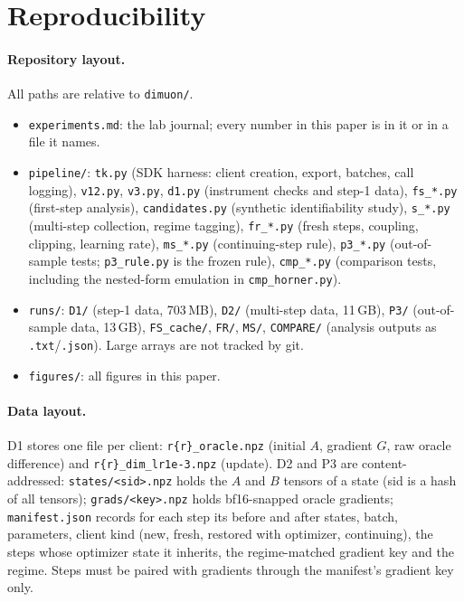 \documentclass[11pt]{article}
\begin{document}
\appendix
\section{Reproducibility}\label{app:repro}

\paragraph{Repository layout.} All paths are relative to \texttt{dimuon/}.
\begin{itemize}
\item \texttt{experiments.md}: the lab journal; every number in this paper is in it or in a file it
names.
\item \texttt{pipeline/}: \texttt{tk.py} (SDK harness: client creation, export, batches, call
logging), \texttt{v12.py}, \texttt{v3.py}, \texttt{d1.py} (instrument checks and step-1 data),
\texttt{fs\_*.py} (first-step analysis), \texttt{candidates.py} (synthetic identifiability study),
\texttt{s\_*.py} (multi-step collection, regime tagging), \texttt{fr\_*.py} (fresh steps, coupling,
clipping, learning rate), \texttt{ms\_*.py} (continuing-step rule), \texttt{p3\_*.py}
(out-of-sample tests; \texttt{p3\_rule.py} is the frozen rule), \texttt{cmp\_*.py} (comparison
tests, including the nested-form emulation in \texttt{cmp\_horner.py}).
\item \texttt{runs/}: \texttt{D1/} (step-1 data, 703\,MB), \texttt{D2/} (multi-step data, 11\,GB),
\texttt{P3/} (out-of-sample data, 13\,GB), \texttt{FS\_cache/}, \texttt{FR/}, \texttt{MS/},
\texttt{COMPARE/} (analysis outputs as \texttt{.txt}/\texttt{.json}). Large arrays are not tracked by
git.
\item \texttt{figures/}: all figures in this paper.
\end{itemize}

\paragraph{Data layout.} D1 stores one file per client: \texttt{r\{r\}\_oracle.npz} (initial $A$,
gradient $G$, raw oracle difference) and \texttt{r\{r\}\_dim\_lr1e-3.npz} (update). D2 and P3 are
content-addressed: \texttt{states/<sid>.npz} holds the $A$ and $B$ tensors of a state (sid is a hash of
all tensors); \texttt{grads/<key>.npz} holds bf16-snapped oracle gradients; \texttt{manifest.json}
records for each step its before and after states, batch, parameters, client kind (new, fresh,
restored with optimizer, continuing), the steps whose optimizer state it inherits, the
regime-matched gradient key and the regime. Steps must be paired with gradients through the manifest's
gradient key only.
\end{document}
